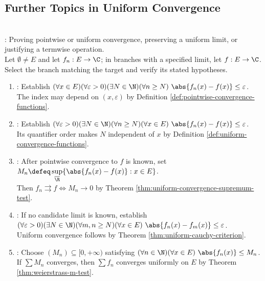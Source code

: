 \subsection{Further Topics in Uniform Convergence}

\begin{proofmethod} \label{meth:uniform-convergence-proof-patterns} \\
: Proving pointwise or uniform convergence, preserving a uniform limit, or justifying a termwise operation.\\
Let $\emptyset\ne E$ and let $f_n:E\to\C$; in branches with a specified limit, let $f:E\to\C$.\\
Select the branch matching the target and verify its stated hypotheses.
\begin{enumerate}[label=(\roman*)]
\setlength{\itemsep}{0pt}
\item {}: Establish $(\forall x\in E)(\forall\varepsilon>0)(\exists N\in\N)(\forall n\geq N)\ \abs{f_n(x)-f(x)}\leq\varepsilon$.\\
The index may depend on $(x,\varepsilon)$ by Definition \ref{def:pointwise-convergence-functions}.
\item {}: Establish $(\forall\varepsilon>0)(\exists N\in\N)(\forall n\geq N)(\forall x\in E)\ \abs{f_n(x)-f(x)}\leq\varepsilon$.\\
Its quantifier order makes $N$ independent of $x$ by Definition \ref{def:uniform-convergence-functions}.
\item {}: After pointwise convergence to $f$ is known, set $M_n\defeq\sup\limits_{\overline{\R}}\{\abs{f_n(x)-f(x)}:x\in E\}$.\\
Then $f_n\rightrightarrows f\Longleftrightarrow M_n\to0$ by Theorem \ref{thm:uniform-convergence-supremum-test}.
\item {}: If no candidate limit is known, establish $(\forall\varepsilon>0)(\exists N\in\N)(\forall m,n\geq N)(\forall x\in E)\ \abs{f_n(x)-f_m(x)}\leq\varepsilon$.\\
Uniform convergence follows by Theorem \ref{thm:uniform-cauchy-criterion}.
\item {}: Choose $(M_n)\subseteq[0,+\infty)$ satisfying $(\forall n\in\N)(\forall x\in E)\ \abs{f_n(x)}\leq M_n$.\\
If $\sum M_n$ converges, then $\sum f_n$ converges uniformly on $E$ by Theorem \ref{thm:weierstrass-m-test}.

\end{enumerate}
\end{proofmethod}
